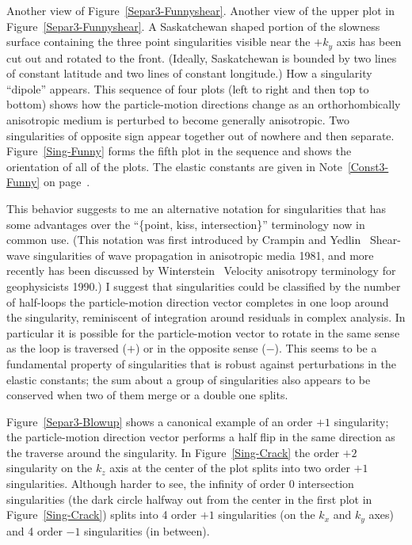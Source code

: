 {Another view of Figure~\protect\ref{Separ3-Funnyshear}.}
{
Another view of the upper plot in Figure~\protect\ref{Separ3-Funnyshear}.
A Saskatchewan shaped portion of the slowness surface
containing the three point singularities visible near the $+k_y$ axis
has been cut out and rotated to the front.
(Ideally, Saskatchewan is bounded by two lines of constant
latitude and two lines of constant longitude.)
}
{How a singularity ``dipole'' appears.}
{
This sequence of four plots (left to right and then top to bottom)
shows how the particle-motion directions change as an orthorhombically
anisotropic medium is perturbed to become generally anisotropic.
Two singularities of opposite sign appear together out of nowhere
and then separate.
Figure~\protect\ref{Sing-Funny} forms the fifth plot in the sequence
and shows the orientation of all of the plots.
The elastic constants are given in Note~\protect\ref{Const3-Funny}
on page~\protect\pageref{Const3-Funny}.
}

This behavior suggests to me an alternative notation for singularities
that has some advantages over the ``\{point, kiss, intersection\}''
terminology now in common use.
(This notation was first introduced by
Crampin and Yedlin~
{Shear-wave singularities of wave propagation in anisotropic media}
{1981}, and more recently has been discussed by
Winterstein~
{Velocity anisotropy terminology for geophysicists}
{1990}.)
I suggest that singularities could be classified
by the number of half-loops the particle-motion direction vector
completes in one loop around the singularity, reminiscent of
integration around residuals in complex analysis.
In particular it is possible
for the particle-motion vector to rotate in the same
sense as the loop is traversed ($+$) or in the opposite sense ($-$).
This seems to be a fundamental property of singularities
that is robust against
perturbations in the elastic constants; the sum about a group of
singularities also appears to be conserved when
two of them merge or a double one splits.

Figure~\ref{Separ3-Blowup} shows a canonical example of an order $+1$
singularity; the particle-motion direction vector performs
a half flip in the same direction as the traverse around the singularity.
In Figure~\ref{Sing-Crack} the order $+2$ singularity on the $k_z$ axis
at the center of the plot splits into two order $+1$ singularities.
Although harder to see, the infinity of order $0$ intersection singularities
(the dark circle halfway out from the center in the first plot
in Figure~\ref{Sing-Crack}) splits into 4 order $+1$ singularities
(on the $k_x$ and $k_y$ axes) and 4 order $-1$ singularities (in between).

